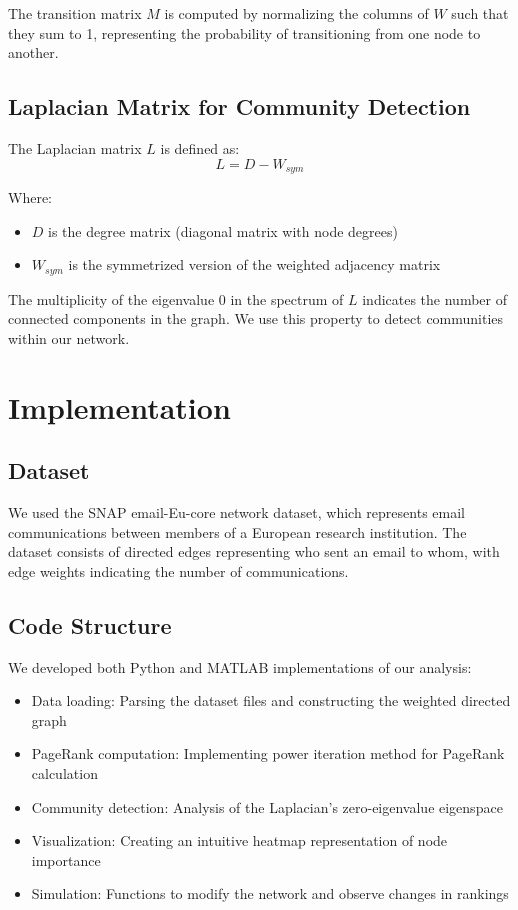 \documentclass[12pt,letterpaper]{article}
\begin{document}
The transition matrix $M$ is computed by normalizing the columns of $W$ such that they sum to 1, representing the probability of transitioning from one node to another.

\subsection{Laplacian Matrix for Community Detection}
The Laplacian matrix $L$ is defined as:
\begin{equation}
    L = D - W_{sym}
\end{equation}

Where:
\begin{itemize}
    \item $D$ is the degree matrix (diagonal matrix with node degrees)
    \item $W_{sym}$ is the symmetrized version of the weighted adjacency matrix
\end{itemize}

The multiplicity of the eigenvalue 0 in the spectrum of $L$ indicates the number of connected components in the graph. We use this property to detect communities within our network.

\section{Implementation}
\subsection{Dataset}
We used the SNAP email-Eu-core network dataset, which represents email communications between members of a European research institution. The dataset consists of directed edges representing who sent an email to whom, with edge weights indicating the number of communications.

\subsection{Code Structure}
We developed both Python and MATLAB implementations of our analysis:

\begin{itemize}
    \item Data loading: Parsing the dataset files and constructing the weighted directed graph
    \item PageRank computation: Implementing power iteration method for PageRank calculation
    \item Community detection: Analysis of the Laplacian's zero-eigenvalue eigenspace
    \item Visualization: Creating an intuitive heatmap representation of node importance
    \item Simulation: Functions to modify the network and observe changes in rankings
\end{itemize}
\end{document}
